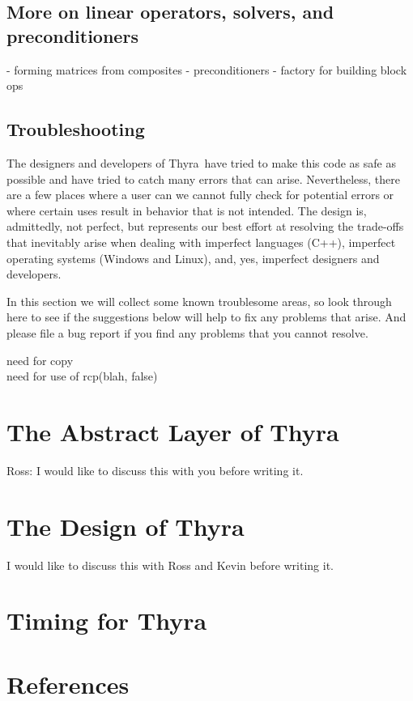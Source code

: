 \documentclass[12pt]{article}
\newcommand{\thyra}{{\sf Thyra}}
\newcommand{\cpp}{{\sf C++}}
\begin{document}


\subsection{More on linear operators, solvers, and preconditioners}\label{moreLinOp}
   - forming matrices from composites
   - preconditioners
   - factory for building block ops

\subsection{Troubleshooting}\label{trouble}

The designers and developers of \thyra\ have tried to make this code
as safe as possible and have tried to catch many errors that can
arise.  Nevertheless, there are a few places where a user can we
cannot fully check for potential errors or where certain uses result
in behavior that is not intended.  The design is, admittedly, not
perfect, but represents our best effort at resolving the trade-offs
that inevitably arise when dealing with imperfect languages (\cpp),
imperfect operating systems (Windows and Linux), and, yes, imperfect
designers and developers.  

In this section we will collect some known troublesome areas, so look
through here to see if the suggestions below will help to fix any
problems that arise.  And 
please file a bug report if you find any
problems that you cannot resolve.  


need for copy\\
need for use of rcp(blah, false)

\section{The Abstract Layer of \thyra}\label{abstract}

Ross: I would like to discuss this with you before writing it.


\section{The Design of \thyra}\label{design}

I would like to discuss this with Ross and Kevin before writing it.

\section{Timing for \thyra} \label{timing}

\section{References}\label{refs}
\end{document}
